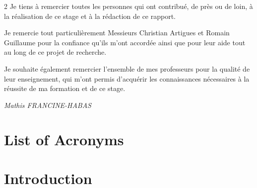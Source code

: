 \documentclass[12pt, a4paper, twoside]{report}
\begin{document}
\begin{spacing}{2}
Je tiens à remercier toutes les personnes qui ont contribué, de près ou de loin, à la réalisation de ce stage et à la rédaction de ce rapport.

Je remercie tout particulièrement Messieurs Christian Artigues et Romain Guillaume pour la confiance qu'ils m'ont accordée ainsi que pour leur aide tout au long de ce projet de recherche.

Je souhaite également remercier l'ensemble de mes professeurs pour la qualité de leur enseignement, 
qui m'ont permis d'acquérir les connaissances nécessaires à la réussite de ma formation et de ce stage.
\end{spacing}

\vspace{1.5cm}
\begin{flushright}
    \textit{Mathis FRANCINE-HABAS}
\end{flushright}

\vspace*{\fill}

\clearpage
\restoregeometry


\clearpage
\tableofcontents
\thispagestyle{empty}

\clearpage
\listoffigures

\clearpage
\listoftables

\clearpage
\section*{List of Acronyms}


\clearpage
{}

\section*{Introduction}
\end{document}

